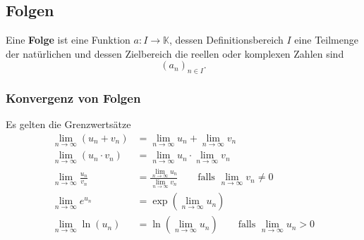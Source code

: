 \documentclass{article}
\begin{document}
\newpage


\subsection{Folgen}
Eine \textbf{Folge} ist eine Funktion $a:I\to\mathbb{K}$, dessen Definitionsbereich $I$ eine Teilmenge der natürlichen und dessen Zielbereich die reellen oder komplexen Zahlen sind
	\begin{equation}
		(a_n)_{n\in I}.
	\end{equation}


\subsubsection{Konvergenz von Folgen}
Es gelten die Grenzwertsätze
	\begin{align}
		\lim_{n\rightarrow\infty} (u_n + v_n) &= \lim_{n\rightarrow\infty} u_n + \lim_{n\rightarrow\infty} v_n\\
		\lim_{n\rightarrow\infty} (u_n \cdot v_n) &= \lim_{n\rightarrow\infty} u_n \cdot \lim_{n\rightarrow\infty} v_n\\
		\lim_{n\rightarrow\infty} \frac{u_n}{v_n} &= \frac{\lim_{n\rightarrow\infty} u_n}{\lim_{n\rightarrow\infty} v_n} \qquad \text{falls $\lim_{n\rightarrow\infty} v_n \neq 0$}\\
		\lim_{n\rightarrow\infty} e^{u_n} &= \exp({\lim_{n\rightarrow\infty} u_n})\\
		\lim_{n\rightarrow\infty} \ln(u_n) &= \ln (\lim_{n\rightarrow\infty} u_n) \qquad \text{falls $\lim_{n\rightarrow\infty} u_n > 0$}
	\end{align}
\end{document}
